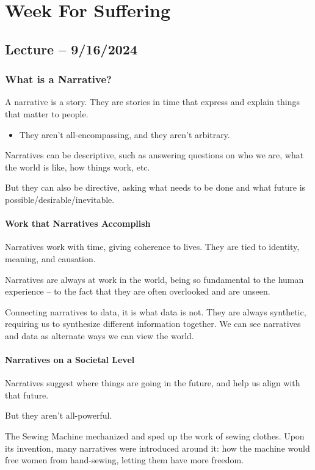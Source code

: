 \documentclass[openany]{book}
\begin{document}
\chapter{Week For Suffering}
\section{Lecture -- 9/16/2024}
\subsection{What is a Narrative?}
A narrative is a story. They are stories in time that express and explain things that matter to people.
\begin{itemize}
	\item They aren't all-encompassing, and they aren't arbitrary.
\end{itemize}

Narratives can be descriptive, such as answering questions on who we are, what the world is like, how things work, etc.

But they can also be directive, asking what needs to be done and what future is possible/desirable/inevitable.

\subsubsection{Work that Narratives Accomplish}
Narratives work with time, giving coherence to lives. They are tied to identity, meaning, and causation.

Narratives are always at work in the world, being so fundamental to the human experience -- to the fact that they are often overlooked and are unseen.

Connecting narratives to data, it is what data is not. They are always synthetic, requiring us to synthesize different information together. We can see narratives and data as alternate ways we can view the world.

\subsubsection{Narratives on a Societal Level}
Narratives suggest where things are going in the future, and help us align with that future.

But they aren't all-powerful.

\begin{example}
	The Sewing Machine mechanized and sped up the work of sewing clothes. Upon its invention, many narratives were introduced around it: how the machine would free women from hand-sewing, letting them have more freedom.
\end{example}
\end{document}
